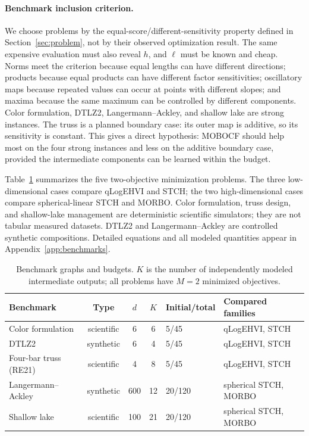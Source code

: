 \documentclass{article}
\newcommand{\composemap}{\ell}
\begin{document}
\paragraph{Benchmark inclusion criterion.}
We choose problems by the equal-score/different-sensitivity property defined in
Section~\ref{sec:problem}, not by their observed optimization result.  The same
expensive evaluation must also reveal $h$, and $\composemap$ must be known and
cheap.  Norms meet the criterion because equal lengths can have different
directions; products because equal products can have different factor
sensitivities; oscillatory maps because repeated values can occur at points
with different slopes; and maxima because the same maximum can be controlled
by different components.  Color formulation, DTLZ2, Langermann--Ackley, and
shallow lake are strong instances.  The truss is a planned boundary case: its
outer map is additive, so its sensitivity is constant.  This
gives a direct hypothesis: MOBOCF should help most on the four strong instances
and less on the additive boundary case, provided the intermediate components
can be learned within the budget.

Table~\ref{tab:benchmarks} summarizes the five two-objective minimization
problems.  The three low-dimensional cases compare qLogEHVI and STCH; the two
high-dimensional cases compare spherical-linear STCH and MORBO.  Color
formulation, truss design, and shallow-lake management are deterministic
scientific simulators; they are not tabular measured datasets.  DTLZ2 and
Langermann--Ackley are controlled synthetic compositions.  Detailed equations
and all modeled quantities appear in Appendix~\ref{app:benchmarks}.

\begin{table}[t]
\centering
\caption{Benchmark graphs and budgets.  $K$ is the number of independently
modeled intermediate outputs; all problems have $M=2$ minimized objectives.}
\label{tab:benchmarks}
\small
\setlength{\tabcolsep}{4.5pt}
\begin{tabular}{lcccll}
\toprule
Benchmark & Type & $d$ & $K$ & Initial/total & Compared families \\
\midrule
Color formulation & scientific & 6 & 6 & 5/45 & qLogEHVI, STCH \\
DTLZ2 & synthetic & 6 & 4 & 5/45 & qLogEHVI, STCH \\
Four-bar truss (RE21) & scientific & 4 & 8 & 5/45 & qLogEHVI, STCH \\
Langermann--Ackley & synthetic & 600 & 12 & 20/120 & spherical STCH, MORBO \\
Shallow lake & scientific & 100 & 21 & 20/120 & spherical STCH, MORBO \\
\bottomrule
\end{tabular}
\end{table}
\end{document}
